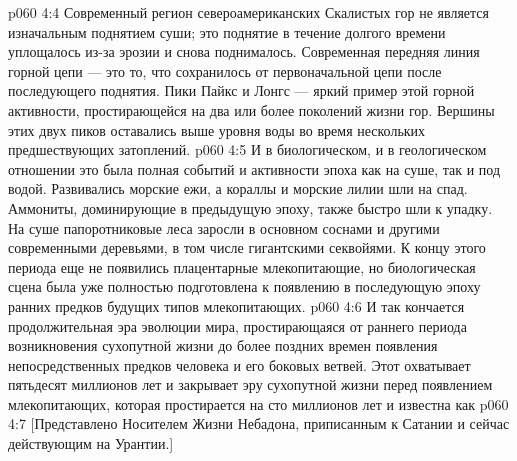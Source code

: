 \vs p060 4:4 Современный регион североамериканских Скалистых гор не является изначальным поднятием суши; это поднятие в течение долгого времени уплощалось из\hyp{}за эрозии и снова поднималось. Современная передняя линия горной цепи --- это то, что сохранилось от первоначальной цепи после последующего поднятия. Пики Пайкс и Лонгс --- яркий пример этой горной активности, простирающейся на два или более поколений жизни гор. Вершины этих двух пиков оставались выше уровня воды во время нескольких предшествующих затоплений.
\vs p060 4:5 И в биологическом, и в геологическом отношении это была полная событий и активности эпоха как на суше, так и под водой. Развивались морские ежи, а кораллы и морские лилии шли на спад. Аммониты, доминирующие в предыдущую эпоху, также быстро шли к упадку. На суше папоротниковые леса заросли в основном соснами и другими современными деревьями, в том числе гигантскими секвойями. К концу этого периода еще не появились плацентарные млекопитающие, но биологическая сцена была уже полностью подготовлена к появлению в последующую эпоху ранних предков будущих типов млекопитающих.
\vs p060 4:6 \pc И так кончается продолжительная эра эволюции мира, простирающаяся от раннего периода возникновения сухопутной жизни до более поздних времен появления непосредственных предков человека и его боковых ветвей. Этот  охватывает пятьдесят миллионов лет и закрывает эру сухопутной жизни перед появлением млекопитающих, которая простирается на сто миллионов лет и известна как 
\vsetoff
\vs p060 4:7 [Представлено Носителем Жизни Небадона, приписанным к Сатании и сейчас действующим на Урантии.]

